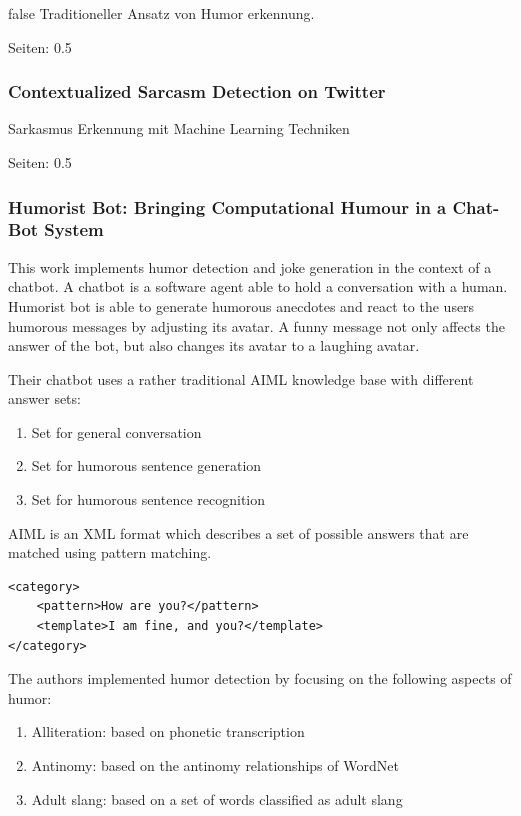 \documentclass[draft,final,oneside]{vutinfth} %
\begin{document}
\if false
Traditioneller Ansatz von Humor erkennung.

\cite{Yang2015HumorRA}

Seiten: 0.5


\subsubsection{Contextualized Sarcasm Detection on Twitter}
Sarkasmus Erkennung mit Machine Learning Techniken

\cite{Bamman2015ContextualizedSD}

Seiten: 0.5
\fi

\subsubsection{Humorist Bot: Bringing Computational Humour in a Chat-Bot System \cite{HumoristBot}}

This work implements humor detection and joke generation in the context of a chatbot. A chatbot is a software agent able to hold a conversation with a human. Humorist bot is able to generate humorous anecdotes and react to the users humorous messages by adjusting its avatar. A funny message not only affects the answer of the bot, but also changes its avatar to a laughing avatar.

Their chatbot uses a rather traditional AIML knowledge base with different answer sets:
\begin{enumerate}
\item Set for general conversation
\item Set for humorous sentence generation
\item Set for humorous sentence recognition
\end{enumerate}

AIML is an XML format which describes a set of possible answers that are matched using pattern matching.

\lstset{language=XML}
\begin{lstlisting}
<category>
    <pattern>How are you?</pattern>
    <template>I am fine, and you?</template>
</category>
\end{lstlisting}

The authors implemented humor detection by focusing on the following aspects of humor: 

\begin{enumerate}
\item Alliteration: based on phonetic transcription
\item Antinomy: based on the antinomy relationships of WordNet 
\item Adult slang: based on a set of words classified as adult slang
\end{enumerate}
\end{document}
